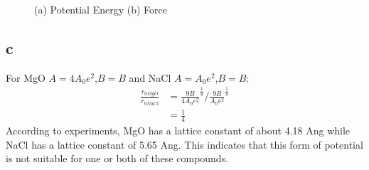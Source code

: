 \documentclass{article}
\begin{document}
\begin{figure}[h!]
\centering
{}
\caption{(a) Potential Energy (b) Force}
\end{figure}
\subsection*{c}
For MgO $A=4A_0e^2$,$B=B$ and NaCl $A=A_0e^2$,$B=B$: 
\begin{align*}
 \frac{r_{0MgO}}{r_{0NaCl}} &=\frac{9B}{4A_0e^2}^{\frac{1}{8}}/\frac{9B}{A_0e^2}^{\frac{1}{8}}\\
	&=\frac{1}{4}
\end{align*}
According to experiments, MgO has a lattice constant of about 4.18 Ang while NaCl has a lattice constant of 5.65 Ang. This indicates that this form of potential is not suitable for one or both of these compounds.
\end{document}
